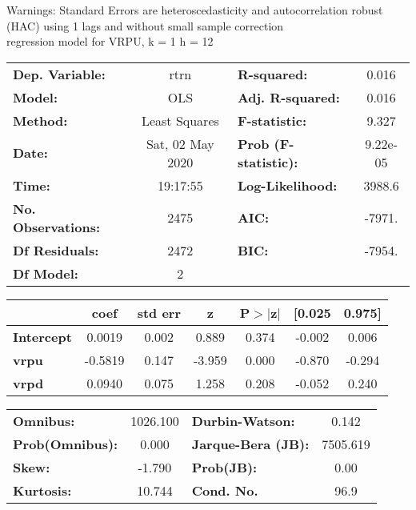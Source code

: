 Warnings: \newline
 [1] Standard Errors are heteroscedasticity and autocorrelation robust (HAC) using 1 lags and without small sample correction\\ 

regression model for VRPU, k = 1 h = 12\begin{center}
\begin{tabular}{lclc}
\toprule
\textbf{Dep. Variable:}    &       rtrn       & \textbf{  R-squared:         } &     0.016   \\
\textbf{Model:}            &       OLS        & \textbf{  Adj. R-squared:    } &     0.016   \\
\textbf{Method:}           &  Least Squares   & \textbf{  F-statistic:       } &     9.327   \\
\textbf{Date:}             & Sat, 02 May 2020 & \textbf{  Prob (F-statistic):} &  9.22e-05   \\
\textbf{Time:}             &     19:17:55     & \textbf{  Log-Likelihood:    } &    3988.6   \\
\textbf{No. Observations:} &        2475      & \textbf{  AIC:               } &    -7971.   \\
\textbf{Df Residuals:}     &        2472      & \textbf{  BIC:               } &    -7954.   \\
\textbf{Df Model:}         &           2      & \textbf{                     } &             \\
\bottomrule
\end{tabular}
\begin{tabular}{lcccccc}
                   & \textbf{coef} & \textbf{std err} & \textbf{z} & \textbf{P$> |$z$|$} & \textbf{[0.025} & \textbf{0.975]}  \\
\midrule
\textbf{Intercept} &       0.0019  &        0.002     &     0.889  &         0.374        &       -0.002    &        0.006     \\
\textbf{vrpu}      &      -0.5819  &        0.147     &    -3.959  &         0.000        &       -0.870    &       -0.294     \\
\textbf{vrpd}      &       0.0940  &        0.075     &     1.258  &         0.208        &       -0.052    &        0.240     \\
\bottomrule
\end{tabular}
\begin{tabular}{lclc}
\textbf{Omnibus:}       & 1026.100 & \textbf{  Durbin-Watson:     } &    0.142  \\
\textbf{Prob(Omnibus):} &   0.000  & \textbf{  Jarque-Bera (JB):  } & 7505.619  \\
\textbf{Skew:}          &  -1.790  & \textbf{  Prob(JB):          } &     0.00  \\
\textbf{Kurtosis:}      &  10.744  & \textbf{  Cond. No.          } &     96.9  \\
\bottomrule
\end{tabular}
\end{center}

